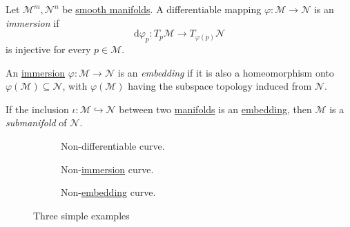 \begin{definition}[Immersion]\label{def:immersion}
	Let \(\mathcal{M} ^m , \mathcal{N} ^n \) be \hyperref[def:smooth-manifold]{smooth manifolds}. A differentiable mapping \(\varphi \colon \mathcal{M} \to  \mathcal{N} \) is an \emph{immersion} if
	\[
		\mathrm{d} \varphi _p \colon T_p \mathcal{M} \to  T_{\varphi (p)} \mathcal{N}
	\]
	is injective for every \(p\in \mathcal{M} \).
\end{definition}

\begin{definition}[Embedding]\label{def:embedding}
	An \hyperref[def:immersion]{immersion} \(\varphi \colon \mathcal{M} \to \mathcal{N} \) is an \emph{embedding} if it is also a homeomorphism onto \(\varphi (\mathcal{M} )\subseteq \mathcal{N} \), with \(\varphi (\mathcal{M} )\) having the subspace topology induced from \(\mathcal{N} \).
\end{definition}

\begin{definition}[Submanifold]\label{def:submanifold}
	If the inclusion \(\iota \colon \mathcal{M} \hookrightarrow \mathcal{N} \) between two \hyperref[def:smooth-manifold]{manifolds} is an \hyperref[def:embedding]{embedding}, then \(\mathcal{M} \) is a \emph{submanifold} of \(\mathcal{N} \).
\end{definition}

\begin{figure}[H]
	\centering
	\begin{subfigure}[b]{0.3\textwidth}
		\centering
		\caption{Non-differentiable curve.}
	\end{subfigure}
	\hfill
	\begin{subfigure}[b]{0.3\textwidth}
		\centering
		\caption{Non-\hyperref[def:immersion]{immersion} curve.}
	\end{subfigure}
	\hfill
	\begin{subfigure}[b]{0.3\textwidth}
		\centering
		\caption{Non-\hyperref[def:embedding]{embedding} curve.}
	\end{subfigure}
	\caption{Three simple examples}
\end{figure}

